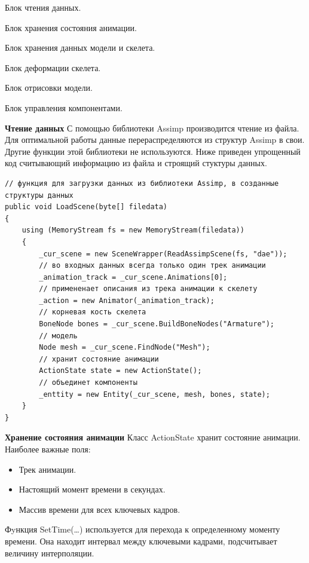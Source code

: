\begin{my_enumerate}
\item Блок чтения данных.
\item Блок хранения состояния анимации.
\item Блок хранения данных модели и скелета.
\item Блок деформации скелета.
\item Блок отрисовки модели.
\item Блок управления компонентами.
\end{my_enumerate}

\textbf{Чтение данных}
С помощью библиотеки Assimp производится чтение из файла. Для оптимальной работы данные перераспределяются из структур Assimp в свои. Другие функции этой библиотеки не используются.
Ниже приведен упрощенный код считывающий информацию из файла и строящий стуктуры данных.

\begin{verbatim}
// функция для загрузки данных из библиотеки Assimp, в созданные структуры данных
public void LoadScene(byte[] filedata)
{
    using (MemoryStream fs = new MemoryStream(filedata))
    {
        _cur_scene = new SceneWrapper(ReadAssimpScene(fs, "dae"));
        // во входных данных всегда только один трек анимации
        _animation_track = _cur_scene.Animations[0];
        // примененает описания из трека анимации к скелету
        _action = new Animator(_animation_track);
        // корневая кость скелета
        BoneNode bones = _cur_scene.BuildBoneNodes("Armature");
        // модель
        Node mesh = _cur_scene.FindNode("Mesh");
        // хранит состояние анимации
        ActionState state = new ActionState();
        // объединет компоненты
        _enttity = new Entity(_cur_scene, mesh, bones, state);
    }
}
\end{verbatim}


\textbf{Хранение состояния анимации}
Класс ActionState хранит состояние анимации. Наиболее важные поля:
\begin{itemize}
\item Трек анимации.
\item Настоящий момент времени в секундах.
\item Массив времени для всех ключевых кадров.
\end{itemize}

Фyнкция SetTime(\dots) используется для перехода к определенному моменту времени. Она находит интервал между ключевыми кадрами, подсчитывает величину интерполяции.


